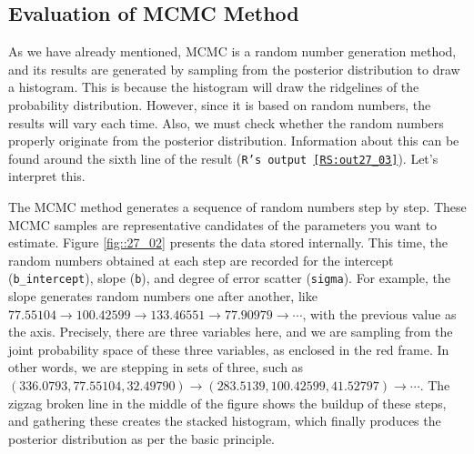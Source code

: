 \documentclass{ltjbook}
\begin{document}
\subsection{Evaluation of MCMC Method}
As we have already mentioned, MCMC is a random number generation method, and its results are generated by sampling from the posterior distribution to draw a histogram. This is because the histogram will draw the ridgelines of the probability distribution. However, since it is based on random numbers, the results will vary each time. Also, we must check whether the random numbers properly originate from the posterior distribution. Information about this can be found around the sixth line of the result (\texttt{R's output \ref{RS:out27_03}}). Let's interpret this.



The MCMC method generates a sequence of random numbers step by step. These MCMC samples are representative candidates of the parameters you want to estimate. Figure \ref{fig::27_02} presents the data stored internally. This time, the random numbers obtained at each step are recorded for the intercept (\verb|b_intercept|), slope (\texttt{b}), and degree of error scatter (\texttt{sigma}). For example, the slope generates random numbers one after another, like $77.55104 \to 100.42599 \to 133.46551 \to 77.90979 \to \cdots$, with the previous value as the axis. Precisely, there are three variables here, and we are sampling from the joint probability space of these three variables, as enclosed in the red frame. In other words, we are stepping in sets of three, such as $(336.0793,77.55104,32.49790)\to (283.5139,100.42599,41.52797) \to \cdots$. The zigzag broken line in the middle of the figure shows the buildup of these steps, and gathering these creates the stacked histogram, which finally produces the posterior distribution as per the basic principle.
\end{document}
